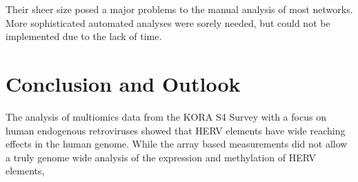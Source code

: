 \documentclass[a4paper,12pt,twoside,openright]{article}
\let\oldsection\section
\def\section{\cleardoublepage\oldsection}
\begin{document}
Their sheer size posed a major problems to the manual analysis of most networks. More sophisticated automated analyses were sorely needed, but could not be implemented due to the lack of time. 


\newpage
\section{Conclusion and Outlook}
\label{Conclusion and Outlook}
The analysis of multiomics data from the KORA S4 Survey with a focus on human endogenous retroviruses showed that HERV elements have wide reaching effects in the human genome. While the array based measurements did not allow a truly genome wide analysis of the expression and methylation of HERV elements, 

\newpage
\listoffigures
\listoftables

{}

\end{document}
